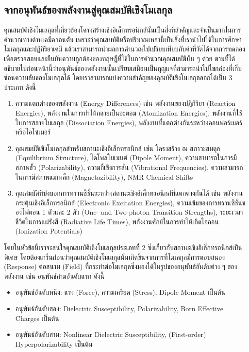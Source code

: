 \subsection{จากอนุพันธ์ของพลังงานสู่คุณสมบัติเชิงโมเลกุล}
\label{ssec:ener_der_mol_prop}

คุณสมบัติเชิงโมเลกุลที่เกี่ยวข้องโครงสร้างเชิงอิเล็กทรอนิกส์นั้นเป็นสิ่งที่สำคัญและจำเป็นมากในการคำนวณทางด้านเคมีควอนตัม เพราะว่าคุณสมบัติหรือปริมาณเหล่านี้เป็นสิ่งที่เรานำไปใช้ในการศึกษาโมเลกุลและปฏิกิริยาเคมี แล้วเราสามารถนำผลการคำนวณไปเปรียบเทียบกับค่าที่วัดได้จากการทดลองเพื่อตรวจสอบและยืนยันความถูกต้องของทฤษฎีที่ใช้ในการคำนวณคุณสมบัตินั้น ๆ ด้วย ตามที่ได้อธิบายไปก่อนหน้านี้ว่าอนุพันธ์ของพลังงานนั้นเปรียบเสมือนเป็นกุญแจที่สามารถนำไปไขกล่องที่เก็บซ่อนความลับของโมเลกุลได้ โดยเราสามารถแบ่งความสำคัญของคุณบัติเชิงโมเลกุลออกได้เป็น 3 ประเภท ดังนี้
%
\begin{enumerate}[topsep=0pt,noitemsep]\setlength\itemsep{0.5em}
    \item ความแตกต่างของพลังงาน (Energy Differences) เช่น พลังงานของปฏิกิริยา (Reaction Energies), พลังงานในการทำให้กลายเป็นอะตอม (Atomization Energies), พลังงานที่ใช้ในการสลายโมเลกุล (Dissociation Energies), พลังงานที่แตกต่างกันระหว่างคอนฟอร์เมอร์หรือไอโซเมอร์

    \item คุณสมบัติเชิงโมเลกุลสำหรับสถานะเชิงอิเล็กทรอนิกส์ เช่น โครงสร้าง ณ สภาวะสมดุล (Equilibrium Structure), ไดโพลโมเมนต์ (Dipole Moment), ความสามารถในการมีสภาพขั้ว (Polarizability), ความถี่เชิงการสั่น (Vibrational Frequencies), ความสามารถในการมีสภาพแม่เหล็ก (Magnetazibility), NMR Chemical Shifts

    \item คุณสมบัติที่บ่งบอกการทรานซิชั่นระหว่างสถานะเชิงอิเล็กทรอนิกส์ที่แตกต่างกันได้ เช่น พลังงานกระตุ้นเชิงอิเล็กทรอนิกส์ (Electronic Excitation Energies), ความเข้มของการทรานซิชั่นของโฟตอน 1 ตัวและ 2 ตัว (One- and Two-photon Transition Strengths), ระยะเวลาชีวิตในการแผ่รังสี (Radiative Life Times), พลังงานศักย์ในการทำให้เกิดไอออน (Ionization Potentials)
\end{enumerate}

โดยในหัวข้อนี้เราจะสนใจคุณสมบัติเชิงโมเลกุลประเภทที่ 2 ซึ่งเกี่ยวกับสถานะเชิงอิเล็กทรอนิกส์เป็นพิเศษ โดยต้องเกริ่นก่อนว่าคุณสมบัติเชิงโมเลกุลนั้นเกิดขึ้นจากการที่โมเลกุลมีการตอบสนอง (Response) ต่อสนาม (Field) ที่กระทำต่อโมเลกุลซึ่งมองได้ในรูปของอนุพันธ์อันดับต่าง ๆ ของพลังงาน เช่น อนุพันธ์สามอันดับแรก ดังนี้
%
\begin{itemize}[topsep=0pt,noitemsep]\setlength\itemsep{0.5em}
    \item อนุพันธ์อันดับหนึ่ง: แรง (Force), ความเครียด (Stress), Dipole Moment เป็นต้น
    
    \item อนุพันธ์อันดับสอง: Dielectric Susceptibility, Polarizability, Born Effective Charges เป็นต้น
    
    \item อนุพันธ์อันดับสาม: Nonlinear Dielectric Susceptibility, (First-order) Hyperpolarizability เป็นต้น
\end{itemize}


